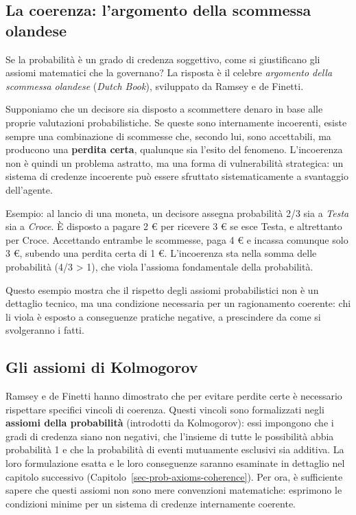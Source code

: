\documentclass[
  italian,
  letterpaper,
  a4paper,
  11pt,
  open=any]{scrbook}
\theoremstyle{plain}
\theoremstyle{definition}
\theoremstyle{definition}
\theoremstyle{remark}
\begin{document}
\subsection{La coerenza: l'argomento della scommessa
olandese}\label{la-coerenza-largomento-della-scommessa-olandese}

Se la probabilità è un grado di credenza soggettivo, come si
giustificano gli assiomi matematici che la governano? La risposta è il
celebre \emph{argomento della scommessa olandese} (\emph{Dutch Book}),
sviluppato da Ramsey e de Finetti.

Supponiamo che un decisore sia disposto a scommettere denaro in base
alle proprie valutazioni probabilistiche. Se queste sono internamente
incoerenti, esiste sempre una combinazione di scommesse che, secondo
lui, sono accettabili, ma producono una \textbf{perdita certa},
qualunque sia l'esito del fenomeno. L'incoerenza non è quindi un
problema astratto, ma una forma di vulnerabilità strategica: un sistema
di credenze incoerente può essere sfruttato sistematicamente a
svantaggio dell'agente.

Esempio: al lancio di una moneta, un decisore assegna probabilità 2/3
sia a \emph{Testa} sia a \emph{Croce}. È disposto a pagare 2 € per
ricevere 3 € se esce Testa, e altrettanto per Croce. Accettando entrambe
le scommesse, paga 4 € e incassa comunque solo 3 €, subendo una perdita
certa di 1 €. L'incoerenza sta nella somma delle probabilità (4/3
\textgreater{} 1), che viola l'assioma fondamentale della probabilità.

Questo esempio mostra che il rispetto degli assiomi probabilistici non è
un dettaglio tecnico, ma una condizione necessaria per un ragionamento
coerente: chi li viola è esposto a conseguenze pratiche negative, a
prescindere da come si svolgeranno i fatti.

\subsection{Gli assiomi di Kolmogorov}\label{gli-assiomi-di-kolmogorov}

Ramsey e de Finetti hanno dimostrato che per evitare perdite certe è
necessario rispettare specifici vincoli di coerenza. Questi vincoli sono
formalizzati negli \textbf{assiomi della probabilità} (introdotti da
Kolmogorov): essi impongono che i gradi di credenza siano non negativi,
che l'insieme di tutte le possibilità abbia probabilità 1 e che la
probabilità di eventi mutuamente esclusivi sia additiva. La loro
formulazione esatta e le loro conseguenze saranno esaminate in dettaglio
nel capitolo successivo (Capitolo~\ref{sec-prob-axioms-coherence}). Per
ora, è sufficiente sapere che questi assiomi non sono mere convenzioni
matematiche: esprimono le condizioni minime per un sistema di credenze
internamente coerente.
\end{document}
